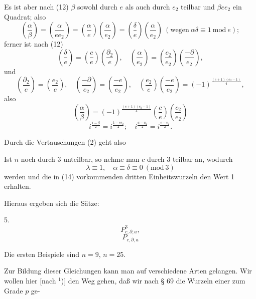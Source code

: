 Es ist aber nach (12) $\beta$ sowohl durch $e$ als auch durch $e_2$
teilbar und $\beta e e_2$ ein Quadrat; also
\[
\left(\frac{\alpha}{\beta}\right) = \left(\frac{\alpha}{ee_2}\right) = \left(\frac{\alpha}{e}\right)\left(\frac{\alpha}{e_2}\right) = \left(\frac{\delta}{e}\right)\left(\frac{\alpha}{e_2}\right) \ (\text{wegen}\ \alpha\delta \equiv 1\ \mathrm{mod}\ e);
\]
ferner ist nach (12)
\[
\left(\frac{\delta}{e}\right) = \left(\frac{c}{e}\right)\left(\frac{\partial_2}{e}\right), \quad \left(\frac{\alpha}{e_2}\right) = \left(\frac{c_2}{e_2}\right)\left(\frac{-\partial}{e_2}\right),
\]
und
\[
\left(\frac{\partial_2}{e}\right) = \left(\frac{e_2}{e}\right), \quad \left(\frac{-\partial}{e_2}\right) = \left(\frac{-e}{e_2}\right), \quad \left(\frac{e_2}{e}\right)\left(\frac{-e}{e_2}\right) = (-1)^{\frac{(e+1)(e_2-1)}{4}},
\]
also
\[
\left(\frac{\alpha}{\beta}\right) = (-1)^{\frac{(e+1)(e_2-1)}{4}}\left(\frac{c}{e}\right)\left(\frac{c_2}{e_2}\right)
\]
\[
i^{\frac{1-\beta}{2}} = i^{\frac{1-ee_2}{2}}; \quad i^{\frac{a-a_2}{2}} = i^{\frac{e-e_2}{2}}.
\]

Durch die Vertauschungen (2) geht also

Ist $n$ noch durch 3 unteilbar, so nehme man $c$ durch 3 teilbar an,
wodurch
\[
\lambda \equiv 1, \quad \alpha \equiv \delta \equiv 0\ (\mathrm{mod}\ 3)
\]
werden und die in (14) vorkommenden dritten Einheitswurzeln den Wert
1 erhalten.

Hieraus ergeben sich die Sätze:

5. 
\[
P^3_{c,\partial,a},
\]
\[
P_{c,\partial,a}
\]

Die ersten Beispiele sind $n=9$, $n=25$.

Zur Bildung dieser Gleichungen kann man auf verschiedene Arten
gelangen. Wir wollen hier [nach $^1$)] den Weg
gehen, daß wir nach § 69 die Wurzeln einer zum Grade $p$ ge-

\begingroup
\renewcommand{\thefootnote}{1)}
\endgroup
